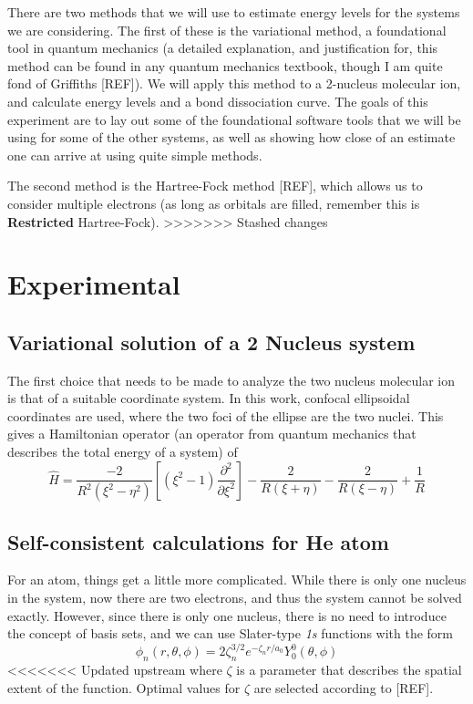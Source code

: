 \documentclass[journal=jacsat,manuscript=communication]{achemso}
\begin{document}
\begin{Abstract}
There are two methods that we will use to estimate energy levels for the systems we are considering.  The first of these is the variational method, a foundational tool in quantum mechanics (a detailed explanation, and justification for, this method can be found in any quantum mechanics textbook, though I am quite fond of Griffiths [REF]).  We will apply this method to a 2-nucleus  molecular ion, and calculate energy levels and a bond dissociation curve.  The goals of this experiment are to lay out some of the foundational software tools that we will be using for some of the other systems, as well as showing how close of an estimate one can arrive at using quite simple methods.

The second method is the Hartree-Fock method [REF], which allows us to consider multiple electrons (as long as orbitals are filled, remember this is \textbf{Restricted} Hartree-Fock).  
>>>>>>> Stashed changes
\section{Experimental}
\subsection{Variational solution of a 2 Nucleus system}
The first choice that needs to be made to analyze the two nucleus  molecular ion is that of a suitable coordinate system.  In this work, confocal ellipsoidal coordinates are used, where the two foci of the ellipse are the two nuclei.  This gives a Hamiltonian operator (an operator from quantum mechanics that describes the total energy of a system) of
\begin{equation}
	\hat{H} = \frac{-2}{R^2\left(\xi^2-\eta^2\right)}\left[\left(\xi^2-1\right)\frac{\partial^2 }{\partial\xi^2}\right]-\frac{2}{R(\xi+\eta)}-\frac{2}{R(\xi-\eta)}+\frac{1}{R}
\end{equation}
\subsection{Self-consistent calculations for He atom}
For an  atom, things get a little more complicated.  While there is only one nucleus in the system, now there are two electrons, and thus the system cannot be solved exactly.  However, since there is only one nucleus, there is no need to introduce the concept of basis sets, and we can use Slater-type \textit{1s} functions with the form 
\begin{equation}
	\phi_n(r,\theta,\phi) = 2\zeta_n^{3/2}e^{-\zeta_nr/a_0}Y_0^0(\theta,\phi)
\end{equation}
<<<<<<< Updated upstream
where $\zeta$ is a parameter that describes the spatial extent of the function.  Optimal values for $\zeta$ are selected according to [REF].


\end{Abstract}
\end{document}
